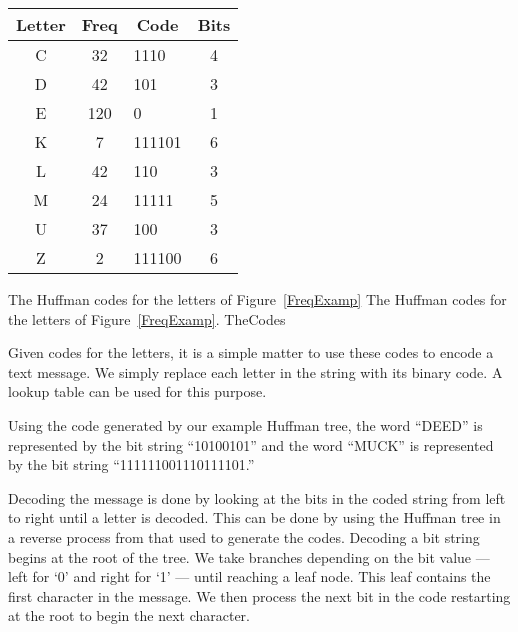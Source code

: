 \begin{mytable}
\begin{center}
\begin{tabular}{c|c|l|c}
\multicolumn{1}{c}{\textbf{Letter}} &
\multicolumn{1}{|c}{\textbf{Freq}} &
\multicolumn{1}{|c}{\textbf{Code}}  &
\multicolumn{1}{|c}{\textbf{Bits}}\\
\hline
C & 32 & 1110 & 4\\
D & 42 & 101 & 3\\
E & 120 & 0 & 1\\
K & 7 & 111101 & 6\\
L & 42 & 110 & 3\\
M & 24 & 11111 & 5\\
U & 37 & 100 & 3\\
Z & 2 & 111100 & 6\\
\end{tabular}
\end{center}
\vspace{-\bigskipamount}
\vspace{-\medskipamount}

\capt{4.5in}
{The Huffman codes for the letters of Figure~\protect\ref{FreqExamp}}
{The Huffman codes for the letters of Figure~\protect\ref{FreqExamp}.}
{TheCodes}
\vspace{-\medskipamount}
\end{mytable}

Given codes for the letters, it is a simple matter to
use these codes to encode a text message.
We simply replace each letter in the string with its binary code.
A lookup table can be used for this purpose.

\begin{example}
Using the code generated by our example Huffman tree, the word
``DEED'' is represented by the bit string ``10100101''
and the word ``MUCK'' is represented by the bit string
``111111001110111101.''
\end{example}

Decoding the message is done by looking at the bits in the coded
string from left to right until a letter is decoded.
This can be done by using the Huffman tree in a reverse process
from that used to generate the codes.
Decoding a bit string begins at the root of the tree.
We take branches depending on the bit value --- left for `0' and right
for `1' --- until reaching a leaf node.
This leaf contains the first character in the message.
We then process the next bit in the code restarting at the root
to begin the next character.

